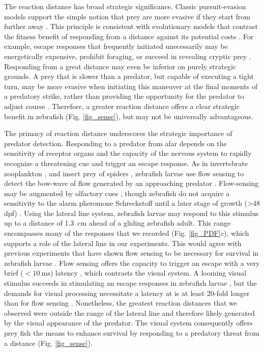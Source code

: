 \documentclass[]{rsos}%
\begin{document}
The reaction distance has broad strategic significance.
Classic pursuit-evasion models support the simple notion that prey are more evasive if they start from further away \cite{Soto:2015cj,Isaacs:1965uz,Weihs:1984tb}.
This principle is consistent with evolutionary models that contrast the fitness benefit of responding from a distance against its potential costs \cite{Cooper:2015vf,Ydenberg:1986tm}.
For example, escape responses that frequently initiated unecessarily may be energetically expensive, prohibit foraging, or succeed in revealing cryptic prey \cite{Broom:2005gq}.
Responding from a great distance may even be inferior on purely strategic grounds.
A prey that is slower than a predator, but capable of executing a tight turn, may be more evasive when initiating this maneuver at the final moments of a predatory strike, rather than providing the opportunity for the predator to adjust course \cite{Howland:1974ud}.
Therefore, a greater reaction distance offers a clear strategic benefit in zebrafish (Fig. \ref{fig_sense}), but may not be universally advantageous.

The primacy of reaction distance underscores the strategic importance of predator detection. 
Responding to a predator from afar depends on the sensitivity of receptor organs and the capacity of the nervous system to rapidly recognize a threatening cue and trigger an escape response.
As in invertebrate zooplankton \cite{Heuch:2007kk}, and insect prey of spiders \cite{Casas:2014bn,Dangles:2006vo}, zebrafish larvae use flow sensing to detect the bow-wave of flow generated by an approaching predator \cite{Stewart:2013bha}.
Flow-sensing may be augmented by olfactory cues \cite{Waldman:1982ic}, though zebrafish do not acquire a sensitivity to the alarm pheromone Schreckstoff until a later stage of growth (>48 dpf) \cite{Waldman:1982ic}.
Using the lateral line system, zebrafish larvae may respond to this stimulus up to a distance of \SI{1.3}{\cm} \cite{Stewart:2014cma} ahead of a gliding zebrafish adult.
This range encompasses many of the responses that we recorded (Fig. \ref{fig_PDF}\textit{c}), which supports a role of the lateral line in our experiments.
This would agree with previous experiments that have shown flow sensing to be necessary for survival in zebrafish larvae \cite{Stewart:2013bha}.
Flow sensing offers the capacity to trigger an escape with a very brief ($< \SI{10}{\ms}$) latency  \cite{Liu:1999fs}, which contrasts the visual system.
A looming visual stimulus succeeds in stimulating an escape responses in zebrafish larvae \cite{Bianco:2011ca}, but the demands for visual processing necessitate a latency at is at least 20-fold longer than for flow sensing \cite{Burgess:2007vp}. 
Nonetheless, the greatest reaction distances that we observed were outside the range of the lateral line and therefore likely generated by the visual appearance of the predator.
The visual system consequently offers prey fish the means to enhance survival by responding to a predatory threat from a distance (Fig. \ref{fig_sense}).
\end{document}
